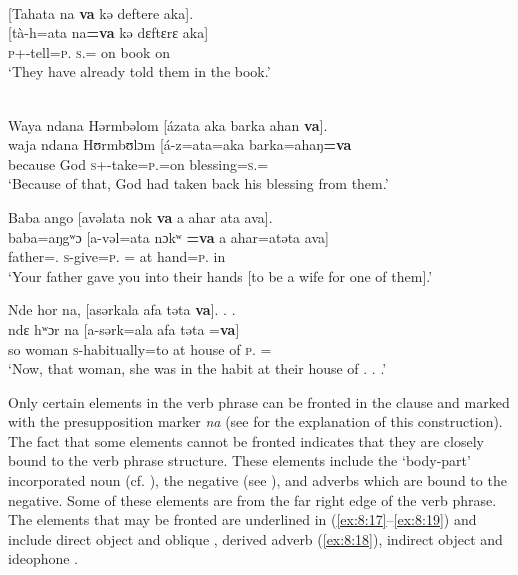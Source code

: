 \ea \label{ex:8:13}\\
{}[Tahata  na \textbf{va}  kə  deftere  aka].\\
\gll  {}[tà-h=ata    na\textbf{=va}    kə  dɛftɛrɛ  aka]\\
      \textsc{p}+{\PFV}-tell=\textsc{p}.{\IO}  \textsc{s}.{\DO}={\PRF}    on  book  on\\
\glt  ‘They have already told them in the book.’ 
\z


\ea \label{ex:8:14}\\
Waya  ndana  Hərmbəlom  [ázata  aka  {barka  ahan} \textbf{va}].\\
\gll  waja  ndana  Hʊrmbʊlɔm   [á-z=ata=aka   {barka}{=ahaŋ}\textbf{=va}\\     
      because    {\DEM}   God             \textsc{s}+{\IFV}-take=\textsc{p}.{\IO}=on   blessing=\textsc{s}.{\POSS}={\PRF}\\  
\glt  ‘Because of that, God had taken back his blessing from them.’
\z

\ea \label{ex:8:15}
Baba  ango  [avəlata  {nok} \textbf{va}  {a  ahar  ata  ava}].\\
\gll  baba=aŋgʷɔ  [a-vəl=ata    {nɔkʷ}  \textbf{=va} {a}  {ahar}{=atəta}  {ava}]\\
      father={\twoS}.{\POSS}  \textsc{s}-give=\textsc{p}.{\IO}    {\twoS}  ={\PRF}  at  hand=\textsc{p}.{\POSS}  in\\
\glt  ‘Your father gave you into their hands [to be a wife for one of them].’
\z

\newpage
\ea \label{ex:8:16}
Nde  hor  na,  [asərkala  {afa  təta}  \textbf{va}]. . .\\
\gll  ndɛ    hʷɔr  na      [a-sərk=ala  {afa}           {təta}     =\textbf{va}]\\
      so    woman  {\PSP}    \textsc{s}-habitually=to   {at house of}  \textsc{p}.{\POSS}   ={\PRF}\\
\glt  ‘Now, that woman, she was in the habit at their house of . . .’ 
\z

Only certain elements in the verb phrase can be fronted in the clause and marked with the presupposition marker \textit{na} (see  for the explanation of this construction). The fact that some elements cannot be fronted indicates that they are closely bound to the verb phrase structure. These elements include the ‘body-part’ incorporated noun (cf. ),  the negative (see ), and adverbs which are bound to the negative. Some of these elements are from the far right edge of the verb phrase. The elements that may be fronted are underlined in (\ref{ex:8:17}--\ref{ex:8:19}) and include direct object and oblique , derived adverb (\ref{ex:8:18}), indirect object and ideophone . 


